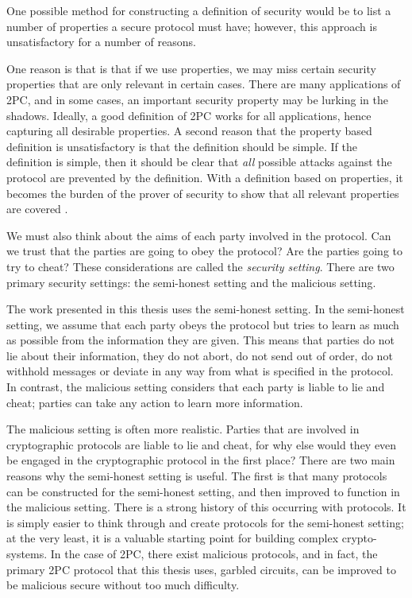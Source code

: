 One possible method for constructing a definition of security would be to list a number of properties a secure protocol must have; however, this approach is unsatisfactory for a number of reasons.

One reason is that is that if we use properties, we may miss certain security properties that are only relevant in certain cases. 
There are many applications of 2PC, and in some cases, an important security property may be lurking in the shadows. 
Ideally, a good definition of 2PC works for all applications, hence capturing all desirable properties.
A second reason that the property based definition is unsatisfactory is that the definition should be simple.
If the definition is simple, then it should be clear that \textit{all} possible attacks against the protocol are prevented by the definition.
With a definition based on properties, it becomes the burden of the prover of security to show that all relevant properties are covered \cite{lindell2009}.

We must also think about the aims of each party involved in the protocol. 
Can we trust that the parties are going to obey the protocol? 
Are the parties going to try to cheat?
These considerations are called the \textit{security setting}.
There are two primary security settings: the semi-honest setting and the malicious setting. 

The work presented in this thesis uses the semi-honest setting. 
In the semi-honest setting, we assume that each party obeys the protocol but tries to learn as much as possible from the information they are given.
This means that parties do not lie about their information, they do not abort, do not send out of order, do not withhold messages or deviate in any way from what is specified in the protocol. 
In contrast, the malicious setting considers that each party is liable to lie and cheat; parties can take any action to learn more information.

The malicious setting is often more realistic. 
Parties that are involved in cryptographic protocols are liable to lie and cheat, for why else would they even be engaged in the cryptographic protocol in the first place?
There are two main reasons why the semi-honest setting is useful.
The first is that many protocols can be constructed for the semi-honest setting, and then improved to function in the malicious setting.
There is a strong history of this occurring with protocols.
It is simply easier to think through and create protocols for the semi-honest setting; at the very least, it is a valuable starting point for building complex crypto-systems.
In the case of 2PC, there exist malicious protocols, and in fact, the primary 2PC protocol that this thesis uses, garbled circuits, can be improved to be malicious secure without too much difficulty. 

